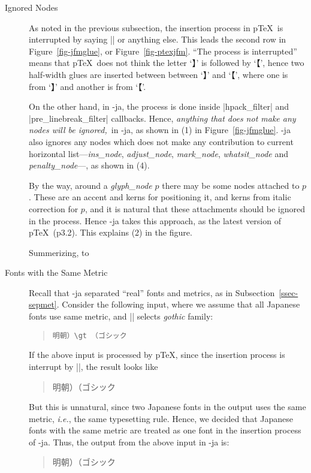 \documentclass{ajt}
\begin{document}
\begin{description}
\item[Ignored Nodes]
As noted in the previous subsection, the insertion process in p\TeX\ is
	   interrupted by saying |{}| or anything else. This leads the
	   second row in Figure~\ref{fig-jfmglue}, or
	   Figure~\ref{fig-ptexjfm}. ``The process is interrupted'' means that p\TeX\
	   does not think the letter `】\inhibitglue' is followed by `\inhibitglue【', hence two
	   half-width glues are inserted between between `】\inhibitglue' and `\inhibitglue【',
	   where one is from `】\inhibitglue' and another is from `\inhibitglue【'.


	   On the other hand, in \LuaTeX-ja, the process is done inside
	   |hpack_filter| and |pre_linebreak_filter| callbacks. Hence,
	   \emph{anything that does not make any nodes will be
	   ignored,}\ in \LuaTeX-ja, as shown in (1) in
	   Figure~\ref{fig-jfmglue}. \LuaTeX-ja also ignores any nodes
	   which does not make any contribution to current horizontal
	   list---\emph{ins\_node}, \emph{adjust\_node},
	   \emph{mark\_node}, \emph{whatsit\_node} and
	   \emph{penalty\_node}---, as shown in (4).

By the way, around a \emph{glyph\_node} $p$ there may be some nodes
	   attached to $p$. These are an accent and kerns for
	   positioning it, and kerns from italic correction for $p$, and
	   it is natural that these attachments should be ignored in the
	   process. Hence \LuaTeX-ja takes this approach, as the latest
	   version of p\TeX\ (p3.2). This explains  (2) in the figure. 

Summerizing, to 

\item[Fonts with the Same Metric]
Recall that \LuaTeX-ja separated ``real'' fonts and metrics, as in Subsection~\ref{ssec-sepmet}. 
Consider the following input, where we assume that all Japanese fonts
	   use same metric, and |\gt| selects \emph{gothic} family:
\begin{quote}
\begin{verbatim}
明朝）\gt （ゴシック
\end{verbatim}
\end{quote}
If the above input is processed by p\TeX, since the insertion process is
	   interrupt by |\gt|, the result looks like
\begin{quote}
\mc 明朝）\hbox{}\gt （ゴシック
\end{quote}
But this is unnatural, since two Japanese fonts in the output uses the
same metric, \emph{i.e.}, the same typesetting rule.  Hence, we decided
that Japanese fonts with the same metric are treated as one font in the
insertion process of \LuaTeX-ja. Thus, the output from the above input
in \LuaTeX-ja is:
\begin{quote}
\mc 明朝）\gt （ゴシック
\end{quote}

\end{description}
\end{document}
